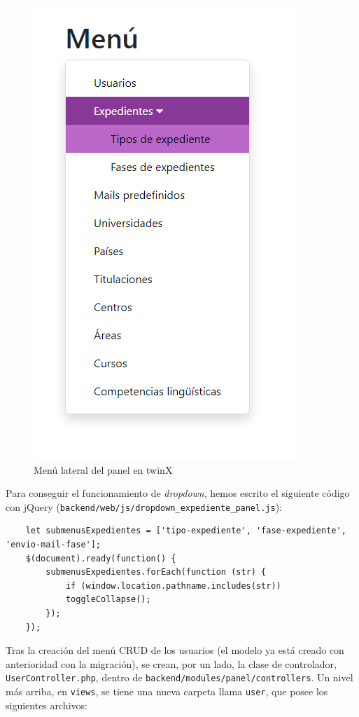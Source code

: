 \begin{figure}
	\centering
	\includegraphics[height=0.4\textheight]{Capturas de twinX/sidebar_panel}
	\caption{Menú lateral del panel en twinX}
	\label{fig:sidebarpaneltwinX}
\end{figure}

Para conseguir el funcionamiento de \textit{dropdown}, hemos escrito el siguiente código con jQuery (\texttt{backend/web/js/dropdown\_expediente\_panel.js}):

\begin{verbatim}
	let submenusExpedientes = ['tipo-expediente', 'fase-expediente', 'envio-mail-fase'];
	$(document).ready(function() {
		submenusExpedientes.forEach(function (str) {
			if (window.location.pathname.includes(str))
			toggleCollapse();
		});
	});
\end{verbatim}

Tras la creación del menú CRUD de los usuarios (el modelo ya está creado con anterioridad con la migración), se crean, por un lado, la clase de controlador, \texttt{UserController.php}, dentro de \texttt{backend/modules/panel/controllers}. Un nivel más arriba, en \texttt{views}, se tiene una nueva carpeta llama \texttt{user}, que posee los siguientes archivos:

